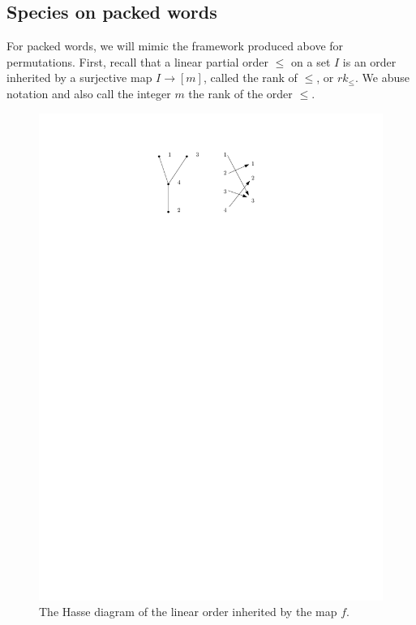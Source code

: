 \documentclass[12pt, reqno]{amsart}
\theoremstyle{definition}
\begin{document}
\subsection{Species on packed words}


For packed words, we will mimic the framework produced above for permutations.
First, recall that a linear partial order $\leq$ on a set $I$ is an order inherited by a surjective map $I \to [m]$, called the rank of $\leq$, or $rk_{\leq}$.
We abuse notation and also call the integer $m$ the rank of the order $\leq$.

\begin{figure}[h]
	\centering
	\includegraphics[scale=1]{images/packedWordOrder.pdf}
	\caption{The Hasse diagram of the linear order inherited by the map $f$. \label{fig:packedWordOrder}}
\end{figure}
\end{document}
